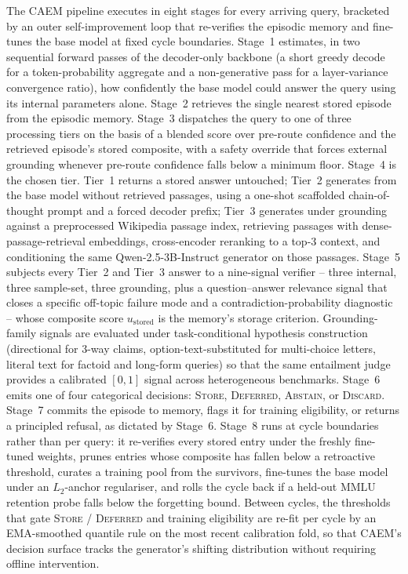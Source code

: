 The CAEM pipeline executes in eight stages for every arriving query, bracketed by an outer self-improvement loop that re-verifies the episodic memory and fine-tunes the base model at fixed cycle boundaries. Stage~1 estimates, in two sequential forward passes of the decoder-only backbone (a short greedy decode for a token-probability aggregate and a non-generative pass for a layer-variance convergence ratio), how confidently the base model could answer the query using its internal parameters alone. Stage~2 retrieves the single nearest stored episode from the episodic memory. Stage~3 dispatches the query to one of three processing tiers on the basis of a blended score over pre-route confidence and the retrieved episode's stored composite, with a safety override that forces external grounding whenever pre-route confidence falls below a minimum floor. Stage~4 is the chosen tier. Tier~1 returns a stored answer untouched; Tier~2 generates from the base model without retrieved passages, using a one-shot scaffolded chain-of-thought prompt and a forced decoder prefix; Tier~3 generates under grounding against a preprocessed Wikipedia passage index, retrieving passages with dense-passage-retrieval embeddings, cross-encoder reranking to a top-3 context, and conditioning the same Qwen-2.5-3B-Instruct generator on those passages. Stage~5 subjects every Tier~2 and Tier~3 answer to a nine-signal verifier -- three internal, three sample-set, three grounding, plus a question--answer relevance signal that closes a specific off-topic failure mode and a contradiction-probability diagnostic -- whose composite score $u_{\text{stored}}$ is the memory's storage criterion. Grounding-family signals are evaluated under task-conditional hypothesis construction (directional for 3-way claims, option-text-substituted for multi-choice letters, literal text for factoid and long-form queries) so that the same entailment judge provides a calibrated $[0,1]$ signal across heterogeneous benchmarks. Stage~6 emits one of four categorical decisions: \textsc{Store}, \textsc{Deferred}, \textsc{Abstain}, or \textsc{Discard}. Stage~7 commits the episode to memory, flags it for training eligibility, or returns a principled refusal, as dictated by Stage~6. Stage~8 runs at cycle boundaries rather than per query: it re-verifies every stored entry under the freshly fine-tuned weights, prunes entries whose composite has fallen below a retroactive threshold, curates a training pool from the survivors, fine-tunes the base model under an $L_{2}$-anchor regulariser, and rolls the cycle back if a held-out MMLU retention probe falls below the forgetting bound. Between cycles, the thresholds that gate \textsc{Store} / \textsc{Deferred} and training eligibility are re-fit per cycle by an EMA-smoothed quantile rule on the most recent calibration fold, so that CAEM's decision surface tracks the generator's shifting distribution without requiring offline intervention.

